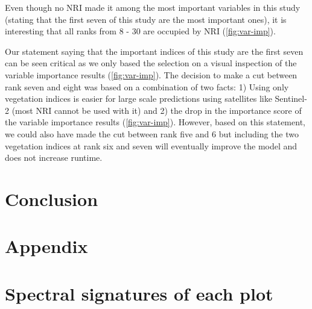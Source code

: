 \documentclass[review]{elsarticle}
\begin{document}
Even though no NRI made it among the most important variables in this study (stating that the first seven of this study are the most important ones), it is interesting that all ranks from 8 - 30 are occupied by NRI (\autoref{fig:var-imp}).

Our statement saying that the important indices of this study are the first seven can be seen critical as we only based the selection on a visual inspection of the variable importance results (\autoref{fig:var-imp}).
The decision to make a cut between rank seven and eight was based on a combination of two facts: 1) Using only vegetation indices is easier for large scale predictions using satellites like Sentinel-2 (most NRI cannot be used with it) and 2) the drop in the importance score of the variable importance results (\autoref{fig:var-imp}).
However, based on this statement, we could also have made the cut between rank five and 6 but including the two vegetation indices at rank six and seven will eventually improve the model and does not increase runtime.

\section{Conclusion}

\section{Appendix}

\appendix
\gdef\thesection{\Alph{section}} %
\makeatletter
\renewcommand\@seccntformat[1]{Appendix \csname the#1\endcsname.\hspace{0.5em}}
\makeatother

\section{Spectral signatures of each plot}
\end{document}
